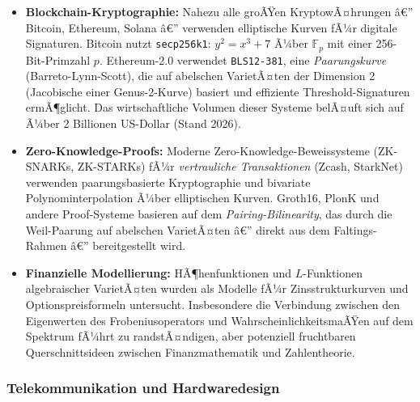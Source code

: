 ﻿\documentclass[12pt,a4paper]{article}
\theoremstyle{plain}
\theoremstyle{definition}
\theoremstyle{remark}
\newcommand{\F}{\mathbb{F}}
\begin{document}
\begin{itemize}[leftmargin=2em,itemsep=4pt]
  \item \textbf{Blockchain-Kryptographie:}
    Nahezu alle groÃŸen KryptowÃ¤hrungen â€” Bitcoin, Ethereum, Solana â€”
    verwenden elliptische Kurven fÃ¼r digitale Signaturen.
    Bitcoin nutzt \texttt{secp256k1}: $y^2 = x^3 + 7$ Ã¼ber $\F_p$ mit einer
    256-Bit-Primzahl $p$. Ethereum-2.0 verwendet \texttt{BLS12-381}, eine
    \emph{Paarungskurve} (Barreto-Lynn-Scott), die auf abelschen VarietÃ¤ten
    der Dimension 2 (Jacobische einer Genus-2-Kurve) basiert und effiziente
    Threshold-Signaturen ermÃ¶glicht. Das wirtschaftliche Volumen dieser Systeme
    belÃ¤uft sich auf Ã¼ber 2 Billionen US-Dollar (Stand 2026).

  \item \textbf{Zero-Knowledge-Proofs:}
    Moderne Zero-Knowledge-Beweissysteme (ZK-SNARKs, ZK-STARKs) fÃ¼r
    \emph{vertrauliche Transaktionen} (Zcash, StarkNet) verwenden
    paarungsbasierte Kryptographie und bivariate Polynominterpolation
    Ã¼ber elliptischen Kurven. Groth16, PlonK und andere Proof-Systeme
    basieren auf dem \emph{Pairing-Bilinearity}, das durch die Weil-Paarung
    auf abelschen VarietÃ¤ten â€” direkt aus dem Faltings-Rahmen â€” bereitgestellt wird.

  \item \textbf{Finanzielle Modellierung:}
    HÃ¶henfunktionen und $L$-Funktionen algebraischer VarietÃ¤ten wurden als
    Modelle fÃ¼r Zinsstrukturkurven und Optionspreisformeln untersucht.
    Insbesondere die Verbindung zwischen den Eigenwerten des Frobeniusoperators
    und WahrscheinlichkeitsmaÃŸen auf dem Spektrum fÃ¼hrt zu randstÃ¤ndigen,
    aber potenziell fruchtbaren Querschnittsideen zwischen Finanzmathematik
    und Zahlentheorie.
\end{itemize}

\subsubsection{Telekommunikation und Hardwaredesign}
\end{document}
